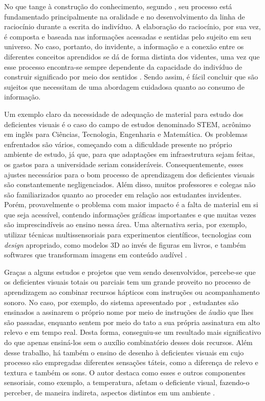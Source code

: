 No que tange à construção do conhecimento, segundo , seu processo está fundamentado principalmente na oralidade e no desenvolvimento da linha de raciocínio durante a escrita do indivíduo. A elaboração do raciocínio, por sua vez, é composta e baseada nas informações acessadas e sentidas pelo sujeito em seu universo. No caso, portanto, do invidente, a informação e a conexão entre os diferentes conceitos aprendidos se dá de forma distinta dos videntes, uma vez que esse processo encontra-se sempre dependente da capacidade do indivíduo de construir significado por meio dos sentidos . Sendo assim, é fácil concluir que são sujeitos que necessitam de uma abordagem cuidadosa quanto ao consumo de informação.

Um exemplo claro da necessidade de adequação de material para estudo dos deficientes visuais é o caso do campo de estudos denominado STEM, acrônimo em inglês para Ciências, Tecnologia, Engenharia e Matemática. Os problemas enfrentados são vários, começando com a dificuldade presente no próprio ambiente de estudo, já que, para que adaptações em infraestrutura sejam feitas, os gastos para a universidade seriam consideráveis. Consequentemente, esses ajustes necessários para o bom processo de aprendizagem dos deficientes visuais são constantemente negligenciados. Além disso, muitos professores e colegas não são familiarizados quanto ao proceder em relação aos estudantes invidentes. Porém, provavelmente o problema com maior impacto é a falta de material em si que seja acessível, contendo informações gráficas importantes e que muitas vezes são imprescindíveis ao ensino nessa área. Uma alternativa seria, por exemplo, utilizar técnicas multissensoriais para experimentos científicos, tecnologias com \textit{design} apropriado, como modelos 3D ao invés de figuras em livros, e também softwares que transformam imagens em conteúdo audível .

Graças a alguns estudos e projetos que vem sendo desenvolvidos, percebe-se que os deficientes visuais totais ou parciais tem um grande proveito no processo de aprendizagem ao combinar recursos hápticos com instruções ou acompanhamento sonoro. No caso, por exemplo, do sistema apresentado por , estudantes são ensinados a assinarem o próprio nome por meio de instruções de áudio que lhes são passadas, enquanto sentem por meio do tato a sua própria assinatura em alto relevo e em tempo real. Desta forma, conseguiu-se um resultado mais significativo do que apenas ensiná-los sem o auxílio combinatório desses dois recursos. Além desse trabalho, há também o ensino de desenho à deficientes visuais em cujo processo são empregadas diferentes sensações táteis, como a diferença de relevo e textura e também os sons. O autor destaca como esses e outros componentes sensoriais, como exemplo, a temperatura, afetam o deficiente visual, fazendo-o perceber, de maneira indireta, aspectos distintos em um ambiente .

